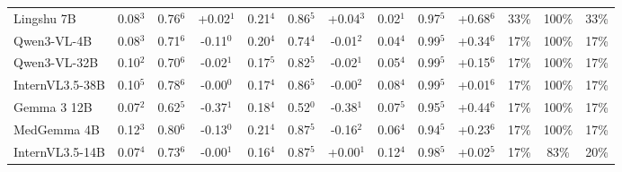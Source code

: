 \begin{table}[t]
\begin{tabular}{l@{\hspace{3pt}}ccc@{\hspace{4pt}}ccc@{\hspace{4pt}}ccc@{\hspace{4pt}}ccc}
Lingshu 7B & \cellcolor{cfSage2}0.08$^{3}$ & \cellcolor{cfSage3}0.76$^{6}$ & \cellcolor{cfSlate2}+0.02$^{1}$ & \cellcolor{cfSage4}0.21$^{4}$ & \cellcolor{cfSage3}0.86$^{5}$ & \cellcolor{cfSlate2}+0.04$^{3}$ & \cellcolor{cfSage1}0.02$^{1}$ & \cellcolor{cfSage4}0.97$^{5}$ & \cellcolor{cfSlate4}+0.68$^{6}$ & \cellcolor{cfSlate3}33\% & \cellcolor{cfSlate4}100\% & 33\% \\
Qwen3-VL-4B & \cellcolor{cfSage2}0.08$^{3}$ & \cellcolor{cfSage2}0.71$^{6}$ & \cellcolor{cfTerra3}-0.11$^{0}$ & \cellcolor{cfSage4}0.20$^{4}$ & \cellcolor{cfSage2}0.74$^{4}$ & \cellcolor{cfTerra1}-0.01$^{2}$ & \cellcolor{cfSage1}0.04$^{4}$ & \cellcolor{cfSage4}0.99$^{5}$ & \cellcolor{cfSlate4}+0.34$^{6}$ & \cellcolor{cfSlate3}17\% & \cellcolor{cfSlate4}100\% & 17\% \\
Qwen3-VL-32B & \cellcolor{cfSage2}0.10$^{2}$ & \cellcolor{cfSage2}0.70$^{6}$ & \cellcolor{cfTerra2}-0.02$^{1}$ & \cellcolor{cfSage3}0.17$^{5}$ & \cellcolor{cfSage3}0.82$^{5}$ & \cellcolor{cfTerra2}-0.02$^{1}$ & \cellcolor{cfSage2}0.05$^{4}$ & \cellcolor{cfSage4}0.99$^{5}$ & \cellcolor{cfSlate3}+0.15$^{6}$ & \cellcolor{cfSlate3}17\% & \cellcolor{cfSlate4}100\% & 17\% \\
InternVL3.5-38B & \cellcolor{cfSage2}0.10$^{5}$ & \cellcolor{cfSage3}0.78$^{6}$ & \cellcolor{cfTerra1}-0.00$^{0}$ & \cellcolor{cfSage3}0.17$^{4}$ & \cellcolor{cfSage3}0.86$^{5}$ & \cellcolor{cfTerra1}-0.00$^{2}$ & \cellcolor{cfSage2}0.08$^{4}$ & \cellcolor{cfSage4}0.99$^{5}$ & \cellcolor{cfSlate1}+0.01$^{6}$ & \cellcolor{cfSlate3}17\% & \cellcolor{cfSlate4}100\% & 17\% \\
Gemma 3 12B & \cellcolor{cfSage2}0.07$^{2}$ & \cellcolor{cfSage2}0.62$^{5}$ & \cellcolor{cfTerra4}-0.37$^{1}$ & \cellcolor{cfSage3}0.18$^{4}$ & \cellcolor{cfSage1}0.52$^{0}$ & \cellcolor{cfTerra4}-0.38$^{1}$ & \cellcolor{cfSage2}0.07$^{5}$ & \cellcolor{cfSage4}0.95$^{5}$ & \cellcolor{cfSlate4}+0.44$^{6}$ & \cellcolor{cfSlate3}17\% & \cellcolor{cfSlate4}100\% & 17\% \\
MedGemma 4B & \cellcolor{cfSage3}0.12$^{3}$ & \cellcolor{cfSage3}0.80$^{6}$ & \cellcolor{cfTerra3}-0.13$^{0}$ & \cellcolor{cfSage4}0.21$^{4}$ & \cellcolor{cfSage3}0.87$^{5}$ & \cellcolor{cfTerra3}-0.16$^{2}$ & \cellcolor{cfSage2}0.06$^{4}$ & \cellcolor{cfSage4}0.94$^{5}$ & \cellcolor{cfSlate3}+0.23$^{6}$ & \cellcolor{cfSlate3}17\% & \cellcolor{cfSlate4}100\% & 17\% \\
InternVL3.5-14B & \cellcolor{cfSage2}0.07$^{4}$ & \cellcolor{cfSage2}0.73$^{6}$ & \cellcolor{cfTerra1}-0.00$^{1}$ & \cellcolor{cfSage3}0.16$^{4}$ & \cellcolor{cfSage3}0.87$^{5}$ & \cellcolor{cfSlate1}+0.00$^{1}$ & \cellcolor{cfSage3}0.12$^{4}$ & \cellcolor{cfSage4}0.98$^{5}$ & \cellcolor{cfSlate1}+0.02$^{5}$ & \cellcolor{cfSlate3}17\% & \cellcolor{cfSlate3}83\% & 20\% \\

\end{tabular}
\end{table}
